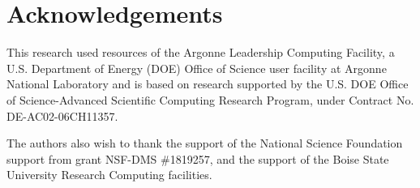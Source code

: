 \section{Acknowledgements}

This research used resources of the Argonne Leadership Computing Facility, a U.S. Department of Energy (DOE) Office of Science user facility at Argonne National Laboratory and is based on research supported by the U.S. DOE Office of Science-Advanced Scientific Computing Research Program, under Contract No. DE-AC02-06CH11357.

The authors also wish to thank the support of the National Science Foundation support from grant NSF-DMS \#1819257, and the support of the Boise State University Research Computing facilities.